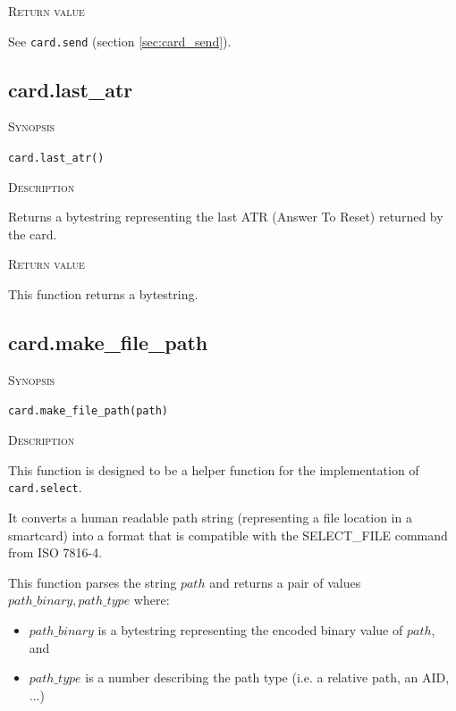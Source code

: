 \documentclass[11pt]{report}
\newcommand{\mansection}[1]{\vspace{0.5em}\par\noindent\textsc{#1}\vspace{0.5em}\par}
\begin{document}
\mansection{Return value}
  See \texttt{card.send} (section \ref{sec:card_send}).


\subsection{card.last\_atr}

\mansection{Synopsis}
\texttt{card.last\_atr()}

\mansection{Description}
  Returns a bytestring representing the last ATR (Answer To Reset) returned by the card.

\mansection{Return value}
  This function returns a bytestring.

\subsection{card.make\_file\_path}

\mansection{Synopsis}
\texttt{card.make\_file\_path(path)}

\mansection{Description}
  This function is designed to be a helper function for the implementation of \texttt{card.select}.

  It converts a human readable path string (representing a file location in
  a smartcard) into a format that is compatible with the SELECT\_FILE command from ISO 7816-4.

  This function parses the string $path$ and returns a pair of values $path\_binary, path\_type$ 
  where:
  \begin{itemize}
  \item{$path\_binary$ is a bytestring representing the encoded binary value of $path$, and}
  \item{$path\_type$ is a number describing the path type (i.e. a relative path, an AID, ...)}
  \end{itemize}
\end{document}
